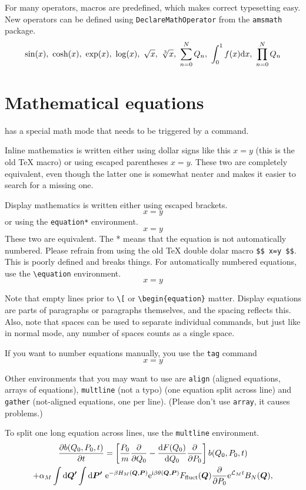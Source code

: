 \documentclass[11pt]{article}
\begin{document}
For many operators, macros are predefined, which makes correct typesetting easy. New operators can be defined using \texttt{DeclareMathOperator} from the \texttt{amsmath} package.
\[
\sin(x),\ \cosh(x),\ \exp(x),\ \log(x),\ \sqrt{x},\ \sqrt[3]{x},\ \sum_{n=0}^{N} Q_n,\ \int_{0}^{1} f(x) \ud x,\ \prod_{n=0}^{N} Q_n
\]

\section{Mathematical equations}
 has a special math mode that needs to be triggered by a command.

Inline mathematics is written either using dollar signs like this $x=y$ (this is the old \TeX{} macro) or using escaped parentheses \(x=y\). These two are completely equivalent, even though the latter one is somewhat neater and makes it easier to search for a missing one.

Display mathematics is written either using escaped brackets.
\[
x=y
\]
or using the \texttt{equation*} environment.
\begin{equation*}
    x=y
\end{equation*}
These two are equivalent. The * means that the equation is not automatically numbered. Please refrain from using the old \TeX{} double dolar macro \texttt{\$\$ x=y \$\$}. This is poorly defined and breaks things. For automatically numbered equations, use the \texttt{\textbackslash equation} environment.
\begin{equation}
    x=y
\end{equation}

Note that empty lines prior to \texttt{\textbackslash[} or \texttt{\textbackslash begin\{equation\}} matter. Display equations are parts of paragraphs or paragraphs themselves, and the spacing reflects this. Also, note that spaces can be used to separate individual commands, but just like in normal mode, any number of spaces counts as a single space. 

If you want to number equations manually, you use the \texttt{tag} command
\[
x=y
\tag{4}
\]

Other environments that you may want to use are \texttt{align} (aligned equations, arrays of equations), \texttt{multline} (not a typo) (one equation split across line) and \texttt{gather} (not-aligned equations, one per line). (Please don't use \texttt{array}, it causes problems.)

To split one long equation across lines, use the \texttt{multline} environment.
\begin{multline}
    \diffp{b(Q_0,P_0,t)}{t} = \left[\frac{P_0}{m}\diffp{}{Q_0} - \frac{\ud F(Q_0)}{\ud Q_0}\diffp{}{P_0}\right] b(Q_0,P_0,t) \\
    + \alpha_M \int \ud \vc{Q'}\int\ud \vc{P'}\ \ue^{-\beta H_M(\vc{Q},\vc{P})}\ue^{\ui\beta \theta(\vc{Q},\vc{P})} F_{\mathrm{fluct}}(\vc{Q})\diffp{}{P_0}\ue^{\mathcal{L}_M t}B_N(\vc{Q}),
\end{multline}
\end{document}
